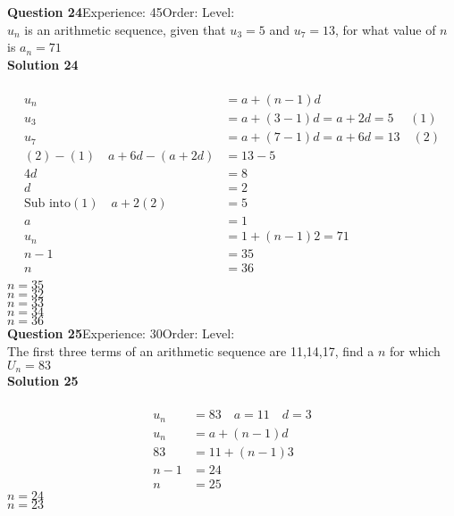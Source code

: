 \documentclass{article}
\begin{document}
\noindent\textbf{Question 24}\hspace{20pt}Experience: 45\hspace{20pt}Order: \hspace{20pt}Level: \\[2pt]
$u_n$ is an arithmetic sequence, given that $u_{3}=5$ and $u_{7}=13$, for what value of $n$ is $a_n=71$\\[4pt]
\noindent\textbf{Solution 24}\\[2pt]
\\[-10pt]\begin{align*}
u_n&=a+(n-1)d\\[2pt]
u_3&=a+(3-1)d=a+2d=5 \hspace{15pt} (1)\\[2pt]
u_7&=a+(7-1)d=a+6d=13\quad (2) \\[2pt]
(2)-(1)\quad a+6d-(a+2d)&=13-5\\[2pt]
4d&=8\\[2pt]
d&=2\\[12pt]
\text{Sub into} (1) \quad a+2(2)&=5\\[2pt]
a&=1\\[12pt]
u_n&=1+(n-1)2=71\\[2pt]
n-1&=35\\[2pt]
n&=36\\[-60pt]
\end{align*}
$n=35$\\
$n=32$\\
$n=33$\\
$n=34$\\
$n=36$\\
\noindent\textbf{Question 25}\hspace{20pt}Experience: 30\hspace{20pt}Order: \hspace{20pt}Level: \\[2pt]
The first three terms of an arithmetic sequence are 11,14,17, find a $n$ for which $U_n=83$\\[4pt]
\noindent\textbf{Solution 25}\\[2pt]
\\[-10pt]\begin{align*}
u_n&=83 \quad a=11 \quad d=3\\[2pt]
u_n&=a+(n-1)d\\[2pt]
83&=11+(n-1)3\\[2pt]
n-1&=24\\[2pt]
n&=25
\end{align*}
$n=24$\\
$n=23$\\
\end{document}
